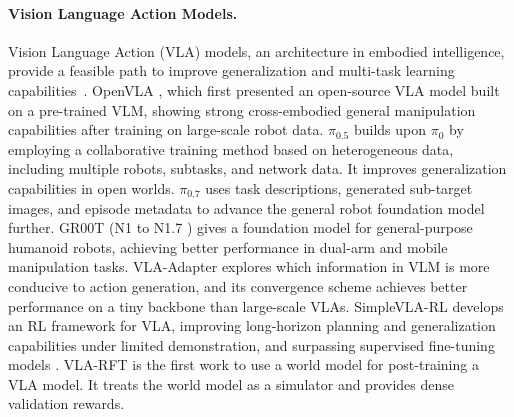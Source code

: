 \documentclass{llmxive}
\begin{document}
\paragraph{Vision Language Action Models.}\label{sec:vlas}
Vision Language Action (VLA) models, an architecture in embodied intelligence, provide a feasible path to improve generalization and multi-task learning capabilities~\citep{manipulation_survey, bai2026latentreasoningvla,lyu2026general,lyu2026last,liu2026pi_0}. OpenVLA \citep{OpenVLA}, which first presented an open-source VLA model built on a pre-trained VLM, showing strong cross-embodied general manipulation capabilities after training on large-scale robot data. 
$\pi_{0.5}$ \citep{pi0.5} builds upon $\pi_{0}$ \citep{pi0} by employing a collaborative training method based on heterogeneous data, including multiple robots, subtasks, and network data. It improves generalization capabilities in open worlds. $\pi_{0.7}$ \citep{pi0.7} uses task descriptions, generated sub-target images, and episode metadata to advance the general robot foundation model further. GR00T (N1 \citep{GR00TN1} to N1.7 \citep{GR00TN1.7}) gives a foundation model for general-purpose humanoid robots, achieving better performance in dual-arm and mobile manipulation tasks. VLA-Adapter \citep{VLA-Adapter} explores which information in VLM is more conducive to action generation, and its convergence scheme achieves better performance on a tiny backbone than large-scale VLAs. SimpleVLA-RL \citep{SimpleVLA-RL} develops an RL framework for VLA, improving long-horizon planning and generalization capabilities under limited demonstration, and surpassing supervised fine-tuning models \citep{han2026dexhil}. VLA-RFT \citep{VLA-RFT} is the first work to use a world model for post-training a VLA model. It treats the world model as a simulator and provides dense validation rewards.


\vspace{-0.5em}
\end{document}
